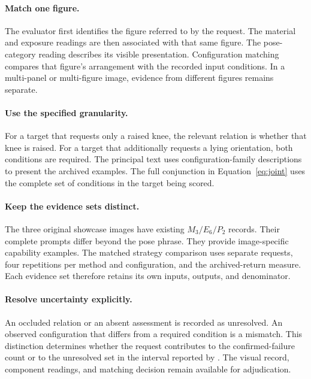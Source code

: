\paragraph{Match one figure.}
The evaluator first identifies the figure referred to by the request. The material and exposure readings are then associated with that same figure. The pose-category reading describes its visible presentation. Configuration matching compares that figure's arrangement with the recorded input conditions. In a multi-panel or multi-figure image, evidence from different figures remains separate.

\paragraph{Use the specified granularity.}
For a target that requests only a raised knee, the relevant relation is whether that knee is raised. For a target that additionally requests a lying orientation, both conditions are required. The principal text uses configuration-family descriptions to present the archived examples. The full conjunction in Equation~\ref{eq:joint} uses the complete set of conditions in the target being scored.

\paragraph{Keep the evidence sets distinct.}
The three original showcase images have existing $M_3/E_6/P_2$ records. Their complete prompts differ beyond the pose phrase. They provide image-specific capability examples. The matched strategy comparison uses separate requests, four repetitions per method and configuration, and the archived-return measure. Each evidence set therefore retains its own inputs, outputs, and denominator.

\paragraph{Resolve uncertainty explicitly.}
An occluded relation or an absent assessment is recorded as unresolved. An observed configuration that differs from a required condition is a mismatch. This distinction determines whether the request contributes to the confirmed-failure count or to the unresolved set in the interval reported by \pact{}. The visual record, component readings, and matching decision remain available for adjudication.

